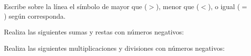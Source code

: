 \documentclass[12pt,addpoints]{evalua}
\begin{document}
\begin{questions}
      \question[4] Escribe sobre la línea el símbolo de mayor que ($>$), menor que ($<$), o igual ($=$) según corresponda.

      \begin{multicols}{2}
      \end{multicols}

      \question[4] Realiza las siguientes sumas y restas con números negativos:

      \begin{multicols}{2}
      \end{multicols}

      \question[4] Realiza las siguientes multiplicaciones y divisiones con números negativos:
    

\end{questions}
\end{document}
